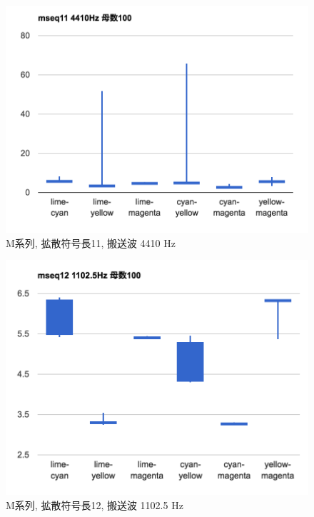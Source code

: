 \begin{figure}[p]
  \centering
  \includegraphics[clip,width=1.05\hsize]{img/m11_4410.png}
  \caption{M系列, 拡散符号長11, 搬送波 4410 Hz}\label{fig:m11Z4410}
\end{figure}

\begin{figure}[p]
  \centering
  \includegraphics[clip,width=1.05\hsize]{img/m12_1102.png}
  \caption{M系列, 拡散符号長12, 搬送波 1102.5 Hz}\label{fig:m12Z1102}
\end{figure}

